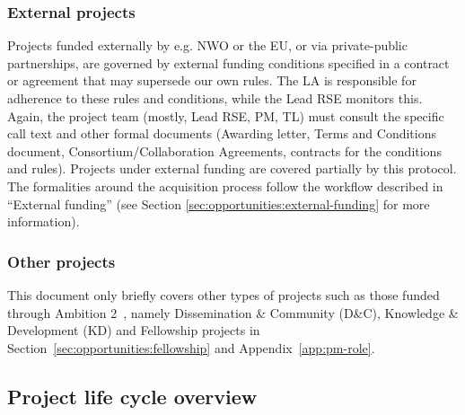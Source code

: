 \subsubsection{External projects}
Projects funded externally by e.g. NWO or the EU, or via private-public partnerships, are governed by external funding
conditions specified in a contract or agreement that may supersede our own rules. %
The LA is responsible for adherence to these rules and conditions, while the Lead RSE monitors this. 
Again, the project team (mostly, Lead RSE, PM, TL) must consult the specific call
text and other formal documents (Awarding letter, Terms and Conditions document, Consortium/Collaboration Agreements, contracts for the conditions
and rules). Projects under external funding are covered partially by this protocol. The formalities around the acquisition process follow the workflow described in “External funding” (see Section
\ref{sec:opportunities:external-funding} for more information).

\subsubsection{Other projects}
This document only briefly covers other types of projects such as those funded through Ambition 2~\cite{nlesc-strategy}, namely Dissemination
\& Community (D\&C), Knowledge \& Development (KD) and Fellowship projects in 
Section~\ref{sec:opportunities:fellowship} and Appendix~\ref{app:pm-role}.

\clearpage
\subsection{Project life cycle overview}
\label{sec:scope:lifecycle}

